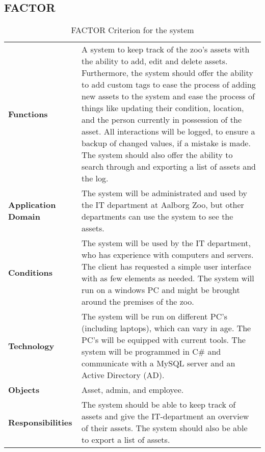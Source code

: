 \subsection{FACTOR} \label{sec:factor}
\par
\begin{table}[H]
    \centering
    {
    \renewcommand{\arraystretch}{2.0}
    \begin{tabular}{ m{4cm} m{10cm} }
        \hline
        
        \textbf{Functions} & A system to keep track of the zoo's assets with the ability to add, edit and delete assets. Furthermore, the system should offer the ability to add custom tags to ease the process of adding new assets to the system and ease the process of things like updating their condition, location, and the person currently in possession of the asset. All interactions will be logged, to ensure a backup of changed values, if a mistake is made. The system should also offer the ability to search through and exporting a list of assets and the log.\\
        
        \textbf{Application Domain} & The system will be administrated and used by the IT department at Aalborg Zoo, but other departments can use the system to see the assets.\\
        
        \textbf{Conditions} & The system will be used by the IT department, who has experience with computers and servers. The client has requested a simple user interface with as few elements as needed. The system will run on a windows PC and might be brought around the premises of the zoo.\\
        
        \textbf{Technology} & The system will be run on different PC's (including laptops), which can vary in age. The PC's will be equipped with current tools. The system will be programmed in C\# and communicate with a MySQL server and an Active Directory (AD).\\
        
        \textbf{Objects} & Asset, admin, and employee.\\
        
        \textbf{Responsibilities} & The system should be able to keep track of assets and give the IT-department an overview of their assets. The system should also be able to export a list of assets.\\
        
        \hline
    \end{tabular}
    \caption{FACTOR Criterion for the system}
    \label{tab:my_label}
    }
\end{table}